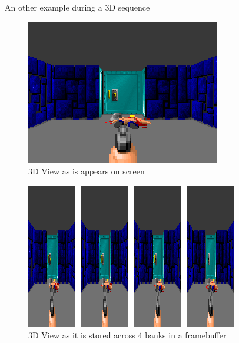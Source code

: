 \documentclass[book.tex]{subfiles}
\begin{document}
\par
An other example during a 3D sequence
\begin{figure}[H]
\centering
 \includegraphics[width=\textwidth]{imgs/vga_layout/wolf3d_7.png}
 \caption{3D View as is appears on screen} \label{fig:vga_layout_in_3D}
 \end{figure}
 \par
 \begin{figure}[H]
\centering
 \includegraphics[width=\textwidth]{imgs/vga_layout/wolf3d_7_bank.png}
 \caption{3D View as it is stored across 4 banks in a framebuffer}
 \end{figure}
\end{document}
